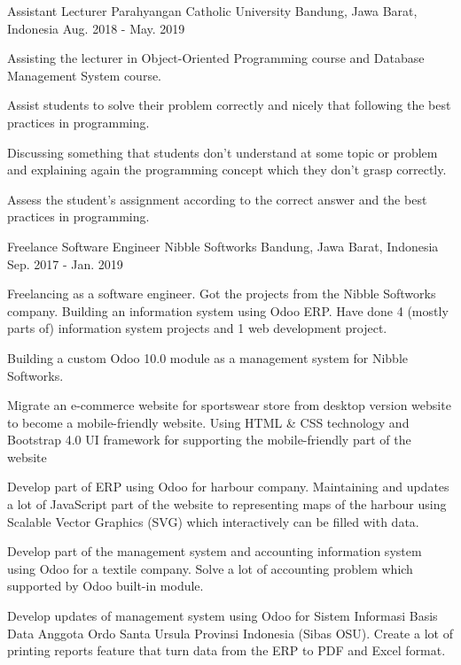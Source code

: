 \begin{cventries}
  \cventry
    {Assistant Lecturer} %
    {Parahyangan Catholic University} %
    {Bandung, Jawa Barat, Indonesia} %
    {Aug. 2018 - May. 2019} %
    {
      \begin{cvitems} %
        \item Assisting the lecturer in Object-Oriented Programming course and Database Management System course.
        \item Assist students to solve their problem correctly and nicely that following the best practices in programming.
        \item Discussing something that students don't understand at some topic or problem and explaining again the programming concept which they don't grasp correctly.
        \item Assess the student's assignment according to the correct answer and the best practices in programming.
      \end{cvitems}
    }

  \cventry
    {Freelance Software Engineer} %
    {Nibble Softworks} %
    {Bandung, Jawa Barat, Indonesia} %
    {Sep. 2017 - Jan. 2019} %
    {
      \begin{cvitems} %
        \item Freelancing as a software engineer. Got the projects from the Nibble Softworks company. Building an information system using Odoo ERP. Have done 4 (mostly parts of) information system projects and 1 web development project.
        \item Building a custom Odoo 10.0 module as a management system for Nibble Softworks.
        \item Migrate an e-commerce website for sportswear store from desktop version website to become a mobile-friendly website. Using HTML & CSS technology and Bootstrap 4.0 UI framework for supporting the mobile-friendly part of the website
        \item Develop part of ERP using Odoo for harbour company. Maintaining and updates a lot of JavaScript part of the website to representing maps of the harbour using Scalable Vector Graphics (SVG) which interactively can be filled with data.
        \item Develop part of the management system and accounting information system using Odoo for a textile company. Solve a lot of accounting problem which supported by Odoo built-in module.
        \item Develop updates of management system using Odoo for Sistem Informasi Basis Data Anggota Ordo Santa Ursula Provinsi Indonesia (Sibas OSU). Create a lot of printing reports feature that turn data from the ERP to PDF and Excel format.
      \end{cvitems}
    }

\end{cventries}
